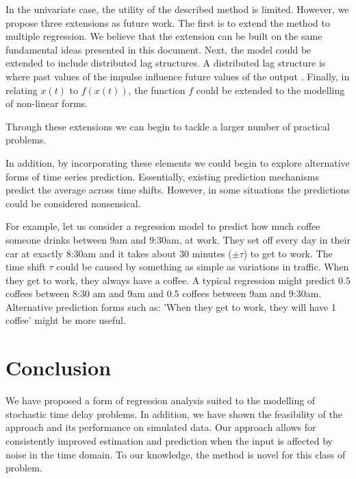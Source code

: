 \documentclass[11pt]{amsart}
\begin{document}
In the univariate case, the utility of the described method is limited. However, we propose three extensions as future work. The first is to extend the method to multiple regression. We believe that the extension can be built on the same fundamental ideas presented in this document. Next, the model could be extended to include distributed lag structures. A distributed lag structure is where past values of the impulse influence future values of the output \cite{almon}. Finally, in relating $x(t)$ to $f(x(t))$, the function $f$ could be extended to the modelling of non-linear forms.

Through these extensions we can begin to tackle a larger number of practical problems.

In addition, by incorporating these elements we could begin to explore alternative forms of time series prediction. Essentially, existing prediction mechanisms predict the average across time shifts. However, in some situations the predictions could be considered nonsensical.

For example, let us consider a regression model to predict how much coffee someone drinks between 9am and 9:30am, at work. They set off every day in their car at exactly 8:30am and it takes about 30 minutes ($\pm \tau$) to get to work. The time shift $\tau$ could be caused by something as simple as variations in traffic. When they get to work, they always have a coffee. A typical regression might predict $0.5$ coffees between 8:30 am and 9am and $0.5$ coffees between 9am and 9:30am. Alternative prediction forms such as: 'When they get to work, they will have 1 coffee' might be more useful.


\section{Conclusion}

We have proposed a form of regression analysis suited to the modelling of stochastic time delay problems. In addition, we have shown the feasibility of the approach and its performance on simulated data. Our approach allows for consistently improved estimation and prediction when the input is affected by noise in the time domain. To our knowledge, the method is novel for this class of problem.






\end{document}
